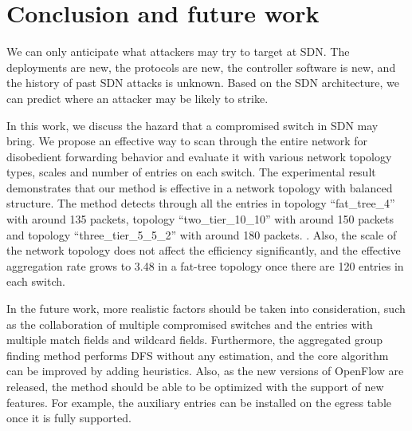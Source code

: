 \chapter{Conclusion and future work}
\label{conclusion}
We can only anticipate what attackers may try to target at SDN. The deployments are new, the protocols are new, the controller software is new, and the history of past SDN attacks is unknown. Based on the SDN architecture, we can predict where an attacker may be likely to strike. 

In this work, we discuss the hazard that a compromised switch in SDN may bring. We propose an effective way to scan through the entire network for disobedient forwarding behavior and evaluate it with various network topology types, scales and number of entries on each switch. The experimental result demonstrates that our method is effective in a network topology with balanced structure. The method detects through all the entries in topology ``fat\_tree\_4'' with around 135 packets, topology ``two\_tier\_10\_10'' with around 150 packets and topology ``three\_tier\_5\_5\_2'' with around 180 packets. \sout{}.  Also, the scale of the network topology does not affect the efficiency significantly, and the effective aggregation rate grows to 3.48 in a fat-tree topology once there are 120 entries in each switch. 

In the future work, more realistic factors should be taken into consideration, such as the collaboration of multiple compromised switches and the entries with multiple match fields and wildcard fields. Furthermore, the aggregated group finding method performs DFS without any estimation, and the core algorithm can be improved by adding heuristics. Also, as the new versions of OpenFlow are released, the method should be able to be optimized with the support of new features. For example, the auxiliary entries can be installed on the egress table once it is fully supported.